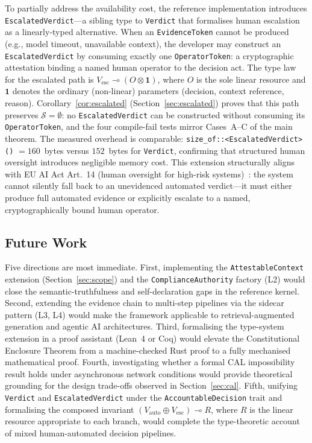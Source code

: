 To partially address the availability cost, the reference
implementation introduces \texttt{EscalatedVerdict}---a sibling type
to \texttt{Verdict} that formalises human escalation as a
linearly-typed alternative.
When an \texttt{EvidenceToken} cannot be produced (e.g., model
timeout, unavailable context), the developer may construct an
\texttt{EscalatedVerdict} by consuming exactly one
\texttt{OperatorToken}: a cryptographic attestation binding a named
human operator to the decision act.
The type law for the escalated path is
$V_{\mathrm{esc}} \multimap (O \otimes \mathbf{1})$,
where $O$ is the sole linear resource and $\mathbf{1}$ denotes the
ordinary (non-linear) parameters (decision, context reference, reason).
Corollary~\ref{cor:escalated} (Section~\ref{sec:escalated}) proves
that this path preserves $\mathcal{S} = \emptyset$: no
\texttt{EscalatedVerdict} can be constructed without consuming its
\texttt{OperatorToken}, and the four compile-fail tests mirror
Cases~A--C of the main theorem.
The measured overhead is comparable:
\texttt{size\_of::\allowbreak<EscalatedVerdict>()} $= 160$~bytes
versus $152$~bytes for \texttt{Verdict}, confirming that structured
human oversight introduces negligible memory cost.
This extension structurally aligns with EU AI Act Art.~14 (human
oversight for high-risk systems)~\cite{eu2024aiact}: the system
cannot silently fall back to an unevidenced automated verdict---it
must either produce full automated evidence or explicitly escalate
to a named, cryptographically bound human operator.

\subsection{Future Work}
\label{sec:future}

Five directions are most immediate.
First, implementing the \texttt{AttestableContext} extension
(Section~\ref{sec:scope}) and the \texttt{ComplianceAuthority}
factory (L2) would close the semantic-truthfulness and
self-declaration gaps in the reference kernel.
Second, extending the evidence chain to multi-step pipelines via
the sidecar pattern (L3, L4) would make the framework applicable
to retrieval-augmented generation and agentic AI architectures.
Third, formalising the type-system extension in a proof assistant
(Lean~4 or Coq) would elevate the Constitutional Enclosure
Theorem from a machine-checked Rust proof to a fully mechanised
mathematical proof.
Fourth, investigating whether a formal CAL impossibility result
holds under asynchronous network conditions would provide
theoretical grounding for the design trade-offs observed in
Section~\ref{sec:cal}.
Fifth, unifying \texttt{Verdict} and \texttt{EscalatedVerdict}
under the \texttt{AccountableDecision} trait and formalising the
composed invariant $(V_{\mathrm{auto}} \oplus V_{\mathrm{esc}})
\multimap R$, where $R$ is the linear resource appropriate to
each branch, would complete the type-theoretic account of
mixed human-automated decision pipelines.

